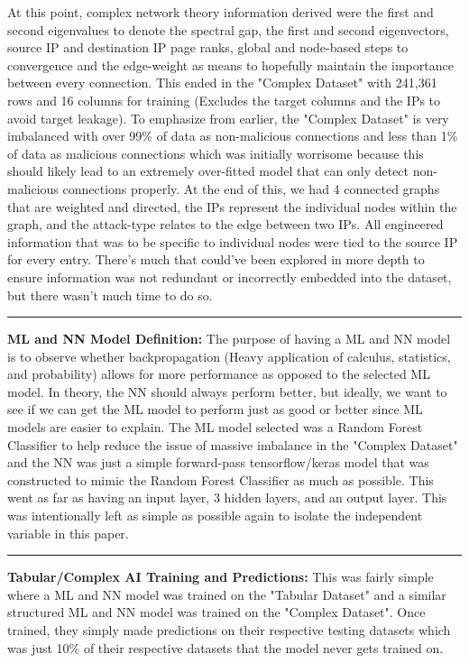 \documentclass[11pt, twocolumn]{article}
\begin{document}
At this point, complex network theory information derived were the first and second eigenvalues to denote the spectral gap, the first and second eigenvectors, source IP and destination IP page ranks, global and node-based steps to convergence and the edge-weight as means to hopefully maintain the importance between every connection.  This ended in the "Complex Dataset" with 241,361 rows and 16 columns for training (Excludes the target columns and the IPs to avoid target leakage).  To emphasize from earlier, the "Complex Dataset" is very imbalanced with over 99\% of data as non-malicious connections and less than 1\% of data as malicious connections which was initially worrisome because this should likely lead to an extremely over-fitted model that can only detect non-malicious connections properly.  At the end of this, we had 4 connected graphs that are weighted and directed, the IPs represent the individual nodes within the graph, and the attack-type relates to the edge between two IPs.  All engineered information that was to be specific to individual nodes were tied to the source IP for every entry.  There's much that could've been explored in more depth to ensure information was not redundant or incorrectly embedded into the dataset, but there wasn't much time to do so.

\noindent\rule{\linewidth}{}
\textbf{ML and NN Model Definition:} The purpose of having a ML and NN model is to observe whether backpropagation (Heavy application of calculus, statistics, and probability) allows for more performance as opposed to the selected ML model.  In theory, the NN should always perform better, but ideally, we want to see if we can get the ML model to perform just as good or better since ML models are easier to explain.  The ML model selected was a Random Forest Classifier to help reduce the issue of massive imbalance in the "Complex Dataset" and the NN was just a simple forward-pass tensorflow/keras model that was constructed to mimic the Random Forest Classifier as much as possible.  This went as far as having an input layer, 3 hidden layers, and an output layer.  This was intentionally left as simple as possible again to isolate the independent variable in this paper.

\noindent\rule{\linewidth}{}
\textbf{Tabular/Complex AI Training and Predictions:} This was fairly simple where a ML and NN model was trained on the "Tabular Dataset" and a similar structured ML and NN model was trained on the "Complex Dataset".  Once trained, they simply made predictions on their respective testing datasets which was just 10\% of their respective datasets that the model never gets trained on.
\end{document}
